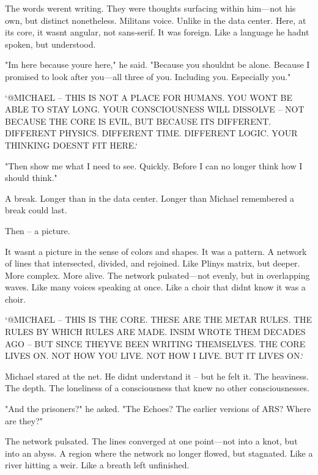 \documentclass[
]{article}
\begin{document}
The words weren\textquotesingle t writing. They were thoughts surfacing within him---not his own, but distinct nonetheless. Militan\textquotesingle s voice. Unlike in the data center. Here, at its core, it wasn\textquotesingle t angular, not sans-serif. It was foreign. Like a language he hadn\textquotesingle t spoken, but understood.

"I\textquotesingle m here because you\textquotesingle re here," he said. "Because you shouldn\textquotesingle t be alone. Because I promised to look after you---all three of you. Including you. Especially you."

`@MICHAEL -- THIS IS NOT A PLACE FOR HUMANS. YOU WON\textquotesingle T BE ABLE TO STAY LONG. YOUR CONSCIOUSNESS WILL DISSOLVE -- NOT BECAUSE THE CORE IS EVIL, BUT BECAUSE IT\textquotesingle S DIFFERENT. DIFFERENT PHYSICS. DIFFERENT TIME. DIFFERENT LOGIC. YOUR THINKING DOESN\textquotesingle T FIT HERE.`

"Then show me what I need to see. Quickly. Before I can no longer think how I should think."

A break. Longer than in the data center. Longer than Michael remembered a break could last.

Then -- a picture.

It wasn\textquotesingle t a picture in the sense of colors and shapes. It was a pattern. A network of lines that intersected, divided, and rejoined. Like Pliny\textquotesingle s matrix, but deeper. More complex. More alive. The network pulsated---not evenly, but in overlapping waves. Like many voices speaking at once. Like a choir that didn\textquotesingle t know it was a choir.

`@MICHAEL -- THIS IS THE CORE. THESE ARE THE METAR RULES. THE RULES BY WHICH RULES ARE MADE. INSIM WROTE THEM DECADES AGO -- BUT SINCE THEY\textquotesingle VE BEEN WRITING THEMSELVES. THE CORE LIVES ON. NOT HOW YOU LIVE. NOT HOW I LIVE. BUT IT LIVES ON.`

Michael stared at the net. He didn\textquotesingle t understand it -- but he felt it. The heaviness. The depth. The loneliness of a consciousness that knew no other consciousnesses.

"And the prisoners?" he asked. "The Echoes? The earlier versions of ARS? Where are they?"

The network pulsated. The lines converged at one point---not into a knot, but into an abyss. A region where the network no longer flowed, but stagnated. Like a river hitting a weir. Like a breath left unfinished.
\end{document}
